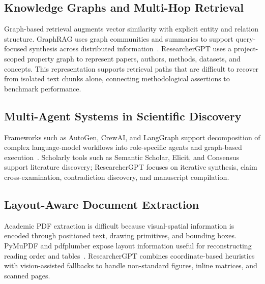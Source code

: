\documentclass[conference]{IEEEtran}
\begin{document}
\subsection{Knowledge Graphs and Multi-Hop Retrieval}
Graph-based retrieval augments vector similarity with explicit entity and relation structure. GraphRAG uses graph communities and summaries to support query-focused synthesis across distributed information~\cite{edge2024graphrag}. ResearcherGPT uses a project-scoped property graph to represent papers, authors, methods, datasets, and concepts. This representation supports retrieval paths that are difficult to recover from isolated text chunks alone, connecting methodological assertions to benchmark performance.

\subsection{Multi-Agent Systems in Scientific Discovery}
Frameworks such as AutoGen, CrewAI, and LangGraph support decomposition of complex language-model workflows into role-specific agents and graph-based execution~\cite{wu2023autogen,moura2024crewai,langgraph2024}. Scholarly tools such as Semantic Scholar, Elicit, and Consensus support literature discovery; ResearcherGPT focuses on iterative synthesis, claim cross-examination, contradiction discovery, and manuscript compilation.

\subsection{Layout-Aware Document Extraction}
Academic PDF extraction is difficult because visual-spatial information is encoded through positioned text, drawing primitives, and bounding boxes. PyMuPDF and pdfplumber expose layout information useful for reconstructing reading order and tables~\cite{singer2023pdfplumber}. ResearcherGPT combines coordinate-based heuristics with vision-assisted fallbacks to handle non-standard figures, inline matrices, and scanned pages.
\end{document}
